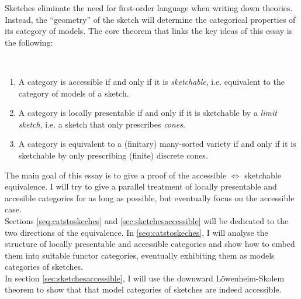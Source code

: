 Sketches eliminate the need for first-order language when writing down theories. Instead, the ``geometry'' of the sketch will determine the categorical properties of its category of models. The core theorem that links the key ideas of this essay is the following:

\begin{Theorem}[Sketchability]\
\begin{enumerate}
\item A category is accessible if and only if it is \emph{sketchable}, i.e. equivalent to the category of models of a sketch. 

\item A category is locally presentable if and only if it is sketchable by a \emph{limit sketch}, i.e. a sketch that only prescribes \emph{cones}.

\item A category is equivalent to a (finitary) many-sorted variety if and only if it is sketchable by only prescribing (finite) discrete cones.
\end{enumerate}
\end{Theorem}

The main goal of this essay is to give a proof of the accessible $\Leftrightarrow$ sketchable equivalence. I will try to give a parallel treatment of locally presentable and accesible categories for as long as possible, but eventually focus on the accessible case. \\

Sections \ref{seq:catstoskeches} and \ref{sec:sketchesaccessible} will be dedicated to the two directions of the equivalence. In \ref{seq:catstoskeches}, I will analyse the structure of locally presentable and accessible categories and show how to embed them into suitable functor categories, eventually exhibiting them as models categories of sketches. \\

In section \ref{sec:sketchesaccessible}, I will use the downward Löwenheim-Skolem theorem to show that that model categories of sketches are indeed accessible.